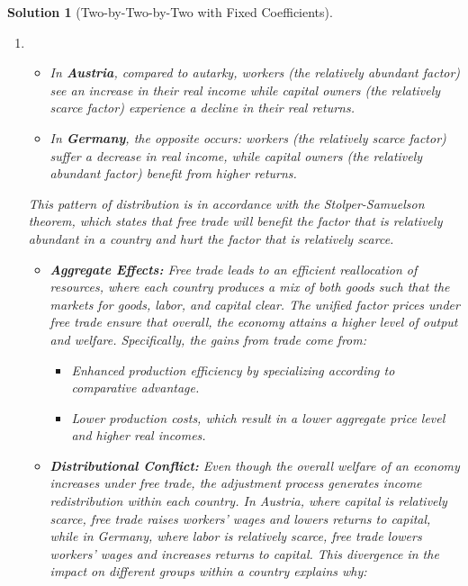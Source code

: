 \documentclass[a4paper,12pt]{article} %
\theoremstyle{nonitalic}
\newtheorem{solution}{Solution}
\begin{document}
\begin{solution}[Two-by-Two-by-Two with Fixed Coefficients]
\begin{enumerate}
\begin{enumerate}
                    \item[(c)] 
                    \begin{itemize}
                        \item In \textbf{Austria}, compared to autarky, workers (the relatively abundant factor) see an increase in their real income while capital owners (the relatively scarce factor) experience a decline in their real returns.
                        \item In \textbf{Germany}, the opposite occurs: workers (the relatively scarce factor) suffer a decrease in real income, while capital owners (the relatively abundant factor) benefit from higher returns.
                    \end{itemize} 
                    This pattern of distribution is in accordance with the Stolper-Samuelson theorem, which states that free trade will benefit the factor that is relatively abundant in a country and hurt the factor that is relatively scarce. 
                    \begin{itemize}
                        \item \textbf{Aggregate Effects:} Free trade leads to an efficient reallocation of resources, where each country produces a mix of both goods such that the markets for goods, labor, and capital clear. The unified factor prices under free trade ensure that overall, the economy attains a higher level of output and welfare. Specifically, the gains from trade come from:
                            \begin{itemize}
                                \item Enhanced production efficiency by specializing according to comparative advantage.
                                \item Lower production costs, which result in a lower aggregate price level and higher real incomes.
                            \end{itemize}
                        \item \textbf{Distributional Conflict:} Even though the overall welfare of an economy increases under free trade, the adjustment process generates income redistribution within each country. In Austria, where capital is relatively scarce, free trade raises workers' wages and lowers returns to capital, while in Germany, where labor is relatively scarce, free trade lowers workers' wages and increases returns to capital. This divergence in the impact on different groups within a country explains why:
                            \begin{itemize}

\end{itemize}
\end{itemize}
\end{enumerate}
\end{enumerate}
\end{solution}
\end{document}
